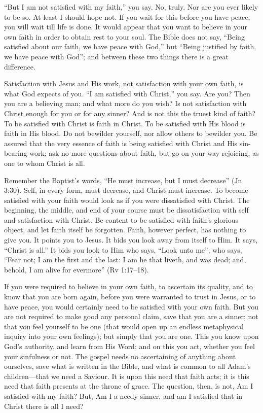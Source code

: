 \documentclass[
]{book}
\begin{document}
``But I am not satisfied with my faith,'' you say. No, truly. Nor are you ever likely to be so. At least I should hope not. If you wait for this before you have peace, you will wait till life is done. It would appear that you want to believe in your own faith in order to obtain rest to your soul. The Bible does not say, ``Being satisfied about our faith, we have peace with God,'' but ``Being justified by faith, we have peace with God''; and between these two things there is a great difference.

Satisfaction with Jesus and His work, not satisfaction with your own faith, is what God expects of you. ``I am satisfied with Christ,'' you say. Are you? Then you are a believing man; and what more do you wish? Is not satisfaction with Christ enough for you or for any sinner? And is not this the truest kind of faith? To be satisfied with Christ is faith in Christ. To be satisfied with His blood is faith in His blood. Do not bewilder yourself, nor allow others to bewilder you. Be assured that the very essence of faith is being satisfied with Christ and His sin-bearing work; ask no more questions about faith, but go on your way rejoicing, as one to whom Christ is all.

Remember the Baptist's words, ``He must increase, but I must decrease'' (Jn 3:30). Self, in every form, must decrease, and Christ must increase. To become satisfied with your faith would look as if you were dissatisfied with Christ. The beginning, the middle, and end of your course must be dissatisfaction with self and satisfaction with Christ. Be content to be satisfied with faith's glorious object, and let faith itself be forgotten. Faith, however perfect, has nothing to give you. It points you to Jesus. It bids you look away from itself to Him. It says, ``Christ is all.'' It bids you look to Him who says, ``Look unto me''; who says, ``Fear not; I am the first and the last: I am he that liveth, and was dead; and, behold, I am alive for evermore'' (Rv 1:17--18).

If you were required to believe in your own faith, to ascertain its quality, and to know that you are born again, before you were warranted to trust in Jesus, or to have peace, you would certainly need to be satisfied with your own faith. But you are not required to make good any personal claim, save that you are a sinner; not that you feel yourself to be one (that would open up an endless metaphysical inquiry into your own feelings); but simply that you are one. This you know upon God's authority, and learn from His Word; and on this you act, whether you feel your sinfulness or not. The gospel needs no ascertaining of anything about ourselves, save what is written in the Bible, and what is common to all Adam's children---that we need a Saviour. It is upon this need that faith acts; it is this need that faith presents at the throne of grace. The question, then, is not, Am I satisfied with my faith? But, Am I a needy sinner, and am I satisfied that in Christ there is all I need?
\end{document}
